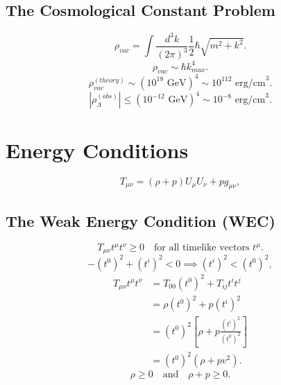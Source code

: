 \documentclass[11pt, a4paper]{report}
\begin{document}
\subsection{The Cosmological Constant Problem}
\begin{equation}
\rho_{vac} = \int \frac{d^3k}{(2\pi)^3} \frac{1}{2}\hbar\sqrt{m^2 + k^2}.
\end{equation}
\begin{equation}
\rho_{vac} \sim \hbar k_{max}^4.
\end{equation}
\begin{equation}
\label{eq:theory_vac}
\rho_{vac}^{(theory)} \sim (10^{18} \text{ GeV})^4 \sim 10^{112} \text{ erg/cm}^3.
\end{equation}
\begin{equation}
\label{eq:obs_vac}
|\rho_{\Lambda}^{(obs)}| \le (10^{-12} \text{ GeV})^4 \sim 10^{-8} \text{ erg/cm}^3.
\end{equation}

\section{Energy Conditions}
\begin{equation}
\label{eq:perfect_fluid}
T_{\mu\nu} = (\rho + p)U_{\mu}U_{\nu} + p g_{\mu\nu},
\end{equation}

\subsection{The Weak Energy Condition (WEC)}
\begin{equation}
T_{\mu\nu} t^{\mu} t^{\nu} \ge 0 \quad \text{for all timelike vectors } t^{\mu}.
\end{equation}
\begin{equation}
-(t^{0})^{2} + (t^{i})^{2} < 0 \implies (t^{i})^{2} < (t^{0})^{2},
\end{equation}
\begin{align}
T_{\mu\nu} t^{\mu} t^{\nu} &= T_{00}(t^{0})^{2} + T_{ij}t^{i}t^{j} \nonumber \\
&= \rho(t^{0})^{2} + p(t^{i})^{2} \nonumber \\
&= (t^{0})^{2} \left[ \rho + p \frac{(t^{i})^{2}}{(t^{0})^{2}} \right] \nonumber \\
&= (t^{0})^{2} (\rho + p v^{2}).
\end{align}
\begin{equation}
\rho \ge 0 \quad \text{and} \quad \rho + p \ge 0.
\end{equation}
\end{document}
